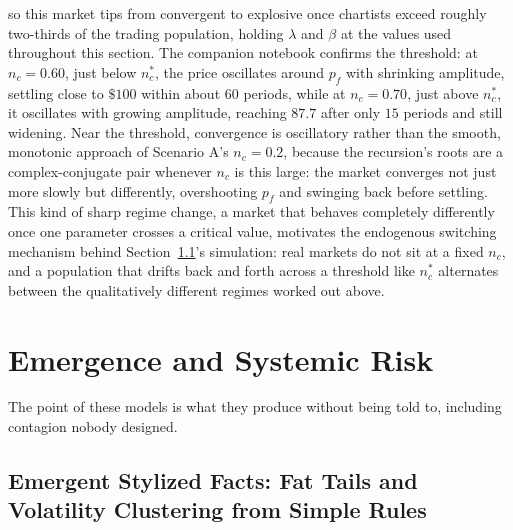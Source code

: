 \documentclass[../ai_in_finance]{subfiles}
\begin{document}
so this market tips from convergent to explosive once chartists exceed roughly two-thirds of the trading population, holding $\lambda$ and $\beta$ at the values used throughout this section. The companion notebook confirms the threshold: at $n_c=0.60$, just below $n_c^{*}$, the price oscillates around $p_f$ with shrinking amplitude, settling close to $\$100$ within about $60$ periods, while at $n_c=0.70$, just above $n_c^{*}$, it oscillates with growing amplitude, reaching $87.7$ after only $15$ periods and still widening. Near the threshold, convergence is oscillatory rather than the smooth, monotonic approach of Scenario A's $n_c=0.2$, because the recursion's roots are a complex-conjugate pair whenever $n_c$ is this large: the market converges not just more slowly but differently, overshooting $p_f$ and swinging back before settling. This kind of sharp regime change, a market that behaves completely differently once one parameter crosses a critical value, motivates the endogenous switching mechanism behind Section~\ref{sec:abm-stylized-facts}'s simulation: real markets do not sit at a fixed $n_c$, and a population that drifts back and forth across a threshold like $n_c^{*}$ alternates between the qualitatively different regimes worked out above.

\section{Emergence and Systemic Risk}

The point of these models is what they produce without being told to, including contagion nobody designed.

\subsection{Emergent Stylized Facts: Fat Tails and Volatility Clustering from Simple Rules}
\label{sec:abm-stylized-facts}
\end{document}
